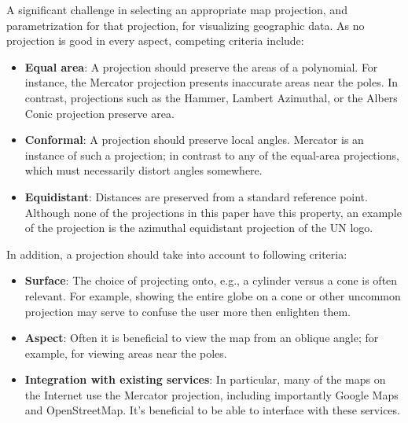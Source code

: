 A significant challenge in selecting an appropriate map projection, and
  parametrization for that projection, for visualizing geographic data.
As no projection is good in every aspect, competing criteria include:

\begin{itemize}
  \item \textbf{Equal area}: A projection should preserve the areas of a
        polynomial. For instance, the Mercator projection presents inaccurate
        areas near the poles. In contrast, projections such as the Hammer,
        Lambert Azimuthal, or the Albers Conic projection preserve area.
  \item \textbf{Conformal}: A projection should preserve local angles.
        Mercator is an instance of such a projection; in contrast to any of the
        equal-area projections, which must necessarily distort angles somewhere.
  \item \textbf{Equidistant}:  Distances are preserved from a standard
        reference point. Although none of the projections in this paper have
        this property, an example of the projection is the azimuthal
        equidistant projection of the UN logo.
\end{itemize}

In addition, a projection should take into account to following criteria:

\begin{itemize}
  \item \textbf{Surface}: The choice of projecting onto, e.g., a cylinder versus
        a cone is often relevant. For example, showing the entire globe on a
        cone or other uncommon projection may serve to confuse the user more
        then enlighten them.
  \item \textbf{Aspect}: Often it is beneficial to view the map from an oblique
        angle; for example, for viewing areas near the poles.
  \item \textbf{Integration with existing services}: In particular, many of the
        maps on the Internet use the Mercator projection, including importantly
        Google Maps and OpenStreetMap. It's beneficial to be able to interface
        with these services.
\end{itemize}

